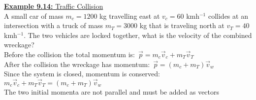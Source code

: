 \documentclass[a4paper]{article}
\let\bf\textbf
\begin{document}
\begin{shaded}
    \underline{\bf{Example 9.14:} Traffic Collision}
    \vspace{2mm}\\
    A small car of mass $m_c = 1200$ kg travelling east at $v_c = 60$ kmh$^{-1}$ collides at an intersection with a truck of mass $m_T = 3000$ kg that is traveling north at $v_T = 40$ kmh$^{-1}$. The two vehicles are locked together, what is the velocity of the combined wreckage?
    \vspace{1mm}\\
    Before the collision the total momentum is:\ $\displaystyle \vec{p} = m_c\vec{v}_c + m_T\vec{v}_T$\\
    After the collision the wreckage has momentum:\ $\displaystyle \vec{p} = (m_c + m_T)\vec{v}_w$\\
    Since the system is closed, momentum is conserved:\ $\displaystyle m_c\vec{v}_c + m_T\vec{v}_T = (m_c + m_T)\vec{v}_w$\\
    The two initial momenta are not parallel and must be added as vectors
    \begin{center}
\end{center}
\end{shaded}
\end{document}
